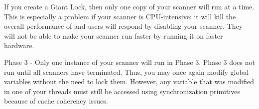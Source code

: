 If you create a Giant Lock, then only one copy of your scanner will
run at a time. This is especially a problem if your scanner is
CPU-intensive: it will kill the overall performance  of \bulk and
users will respond by disabling your scanner. They will not be able to
make your scanner run faster by running it on faster hardware. 

Phase 3 - Only one instance of your scanner will run in Phase 3. Phase
3 does not run until all scanners have terminated. Thus, you may once
again modify global variables without the need to lock them.  However,
any variable that was modified in one of your threads must still be
accessed using synchronization primitives because of cache coherency
issues.







